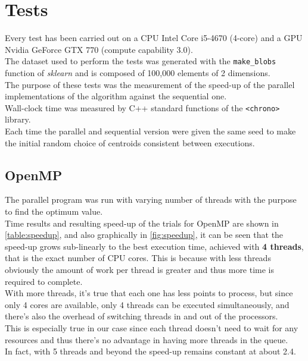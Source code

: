 \documentclass[10pt,twocolumn,letterpaper]{article}
\begin{document}
\section{Tests}
Every test has been carried out on a CPU Intel Core i5-4670 (4-core) and a GPU Nvidia GeForce GTX 770 (compute capability 3.0).\\
The dataset used to perform the tests was generated with the \texttt{make\_blobs} function of \textit{sklearn} and is composed of 100,000 elements of 2 dimensions.\\
The purpose of these tests was the measurement of the speed-up of the parallel implementations of the algorithm against the sequential one.\\
Wall-clock time was measured by C++ standard functions of the \texttt{<chrono>} library.\\
Each time the parallel and sequential version were given the same seed to make the initial random choice of centroids consistent between executions.\\
\subsection{OpenMP}
The parallel program was run with varying number of threads with the purpose to find the optimum value.\\
Time results and resulting speed-up of the trials for OpenMP are shown in \cref{table:speedup}, and also graphically in \cref{fig:speedup}, it can be seen that the speed-up grows sub-linearly to the best execution time, achieved with \textbf{4 threads}, that is the exact number of CPU cores. This is because with less threads obviously the amount of work per thread is greater and thus more time is required to complete.\\ With more threads, it's true that each one has less points to process, but since only 4 cores are available, only 4 threads can be executed simultaneously, and there's also the overhead of switching threads in and out of the processors.\\
This is especially true in our case since each thread doesn't need to wait for any resources and thus there's no advantage in having more threads in the queue.\\
In fact, with 5 threads and beyond the speed-up remains constant at about 2.4.
\end{document}
